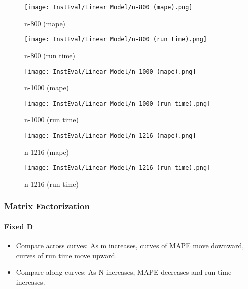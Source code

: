 \documentclass[12pt]{article}
\begin{document}
\begin{figure}[H]
\centering
    \begin{minipage}{0.45\textwidth}
        \centering
        \texttt{[image: InstEval/Linear Model/n-800 (mape).png]}
        \caption{n-800 (mape)}
        \label{fig:figure1}
    \end{minipage}\hfill
    \begin{minipage}{0.45\textwidth}
        \centering
        \texttt{[image: InstEval/Linear Model/n-800 (run time).png]}
        \caption{n-800 (run time)}
    \end{minipage}
\end{figure}

\begin{figure}[H]
\centering
    \begin{minipage}{0.45\textwidth}
        \centering
        \texttt{[image: InstEval/Linear Model/n-1000 (mape).png]}
        \caption{n-1000 (mape)}
        \label{fig:figure1}
    \end{minipage}\hfill
    \begin{minipage}{0.45\textwidth}
        \centering
        \texttt{[image: InstEval/Linear Model/n-1000 (run time).png]}
        \caption{n-1000 (run time)}
    \end{minipage}
\end{figure}

\begin{figure}[H]
\centering
    \begin{minipage}{0.45\textwidth}
        \centering
        \texttt{[image: InstEval/Linear Model/n-1216 (mape).png]}
        \caption{n-1216 (mape)}
        \label{fig:figure1}
    \end{minipage}\hfill
    \begin{minipage}{0.45\textwidth}
        \centering
        \texttt{[image: InstEval/Linear Model/n-1216 (run time).png]}
        \caption{n-1216 (run time)}
    \end{minipage}
\end{figure}



\subsubsection{Matrix Factorization}

\paragraph{Fixed D}
\begin{itemize}
\item Compare across curves: As m increases, curves of MAPE move downward, curves of run time move upward.
\item Compare along curves: As N increases, MAPE decreases and run time increases. 
\end{itemize}
\end{document}
